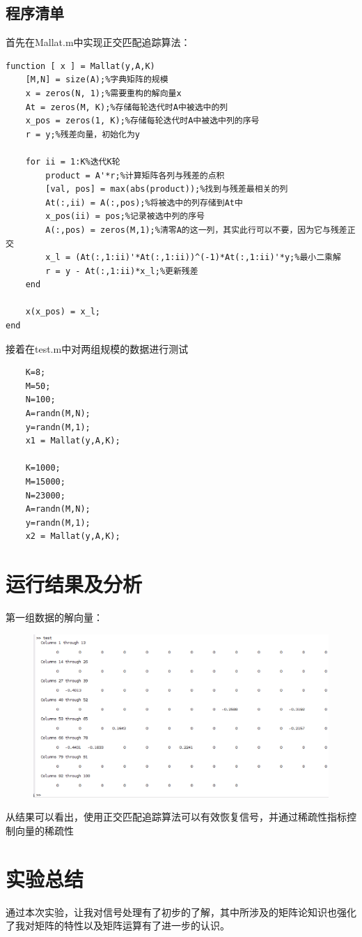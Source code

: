 \documentclass{article}
\begin{document}
\subsection{程序清单}
首先在Mallat.m中实现正交匹配追踪算法：
\begin{lstlisting}
function [ x ] = Mallat(y,A,K)
	[M,N] = size(A);%字典矩阵的规模
	x = zeros(N, 1);%需要重构的解向量x
	At = zeros(M, K);%存储每轮迭代时A中被选中的列
	x_pos = zeros(1, K);%存储每轮迭代时A中被选中列的序号
	r = y;%残差向量，初始化为y
	
	for ii = 1:K%迭代K轮
		product = A'*r;%计算矩阵各列与残差的点积
		[val, pos] = max(abs(product));%找到与残差最相关的列
		At(:,ii) = A(:,pos);%将被选中的列存储到At中
		x_pos(ii) = pos;%记录被选中列的序号
		A(:,pos) = zeros(M,1);%清零A的这一列，其实此行可以不要，因为它与残差正交
		x_l = (At(:,1:ii)'*At(:,1:ii))^(-1)*At(:,1:ii)'*y;%最小二乘解
		r = y - At(:,1:ii)*x_l;%更新残差
	end
	
	x(x_pos) = x_l;
end
\end{lstlisting}
接着在test.m中对两组规模的数据进行测试
\begin{lstlisting}
	K=8;
	M=50;
	N=100;
	A=randn(M,N);
	y=randn(M,1);
	x1 = Mallat(y,A,K);
	
	K=1000;
	M=15000;
	N=23000;
	A=randn(M,N);
	y=randn(M,1);
	x2 = Mallat(y,A,K);
\end{lstlisting}

\section{运行结果及分析}
第一组数据的解向量：
\begin{figure}[h]
	\centering
	\includegraphics[scale=0.6]{output.png}
\end{figure}

从结果可以看出，使用正交匹配追踪算法可以有效恢复信号，并通过稀疏性指标控制向量的稀疏性
\section{实验总结}
通过本次实验，让我对信号处理有了初步的了解，其中所涉及的矩阵论知识也强化了我对矩阵的特性以及矩阵运算有了进一步的认识。
\end{document}
